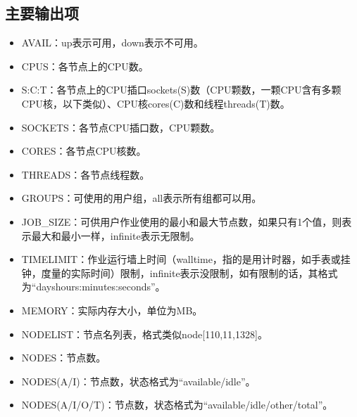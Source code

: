 \documentclass[a4paper,12pt,english]{sphinxmanual}
\begin{document}
\subsection{主要输出项}
\label{\detokenize{slurm/slurm:id7}}\begin{itemize}
\item {} 
\sphinxAtStartPar
AVAIL：up表示可用，down表示不可用。

\item {} 
\sphinxAtStartPar
CPUS：各节点上的CPU数。

\item {} 
\sphinxAtStartPar
S:C:T：各节点上的CPU插口sockets(S)数（CPU颗数，一颗CPU含有多颗CPU核，以下类似）、CPU核cores(C)数和线程threads(T)数。

\item {} 
\sphinxAtStartPar
SOCKETS：各节点CPU插口数，CPU颗数。

\item {} 
\sphinxAtStartPar
CORES：各节点CPU核数。

\item {} 
\sphinxAtStartPar
THREADS：各节点线程数。

\item {} 
\sphinxAtStartPar
GROUPS：可使用的用户组，all表示所有组都可以用。

\item {} 
\sphinxAtStartPar
JOB\_SIZE：可供用户作业使用的最小和最大节点数，如果只有1个值，则表示最大和最小一样，infinite表示无限制。

\item {} 
\sphinxAtStartPar
TIMELIMIT：作业运行墙上时间（walltime，指的是用计时器，如手表或挂钟，度量的实际时间）限制，infinite表示没限制，如有限制的话，其格式为“days\sphinxhyphen{}hours:minutes:seconds”。

\item {} 
\sphinxAtStartPar
MEMORY：实际内存大小，单位为MB。

\item {} 
\sphinxAtStartPar
NODELIST：节点名列表，格式类似node{[}1\sphinxhyphen{}10,11,13\sphinxhyphen{}28{]}。

\item {} 
\sphinxAtStartPar
NODES：节点数。

\item {} 
\sphinxAtStartPar
NODES(A/I)：节点数，状态格式为“available/idle”。

\item {} 
\sphinxAtStartPar
NODES(A/I/O/T)：节点数，状态格式为“available/idle/other/total”。


\end{itemize}
\end{document}
